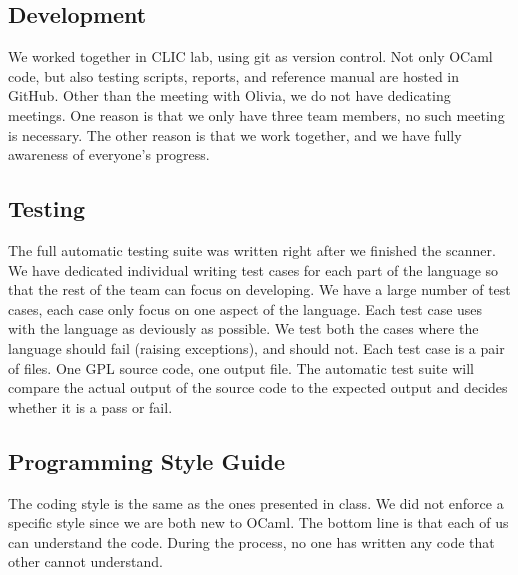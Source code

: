 \documentclass[a4paper,12pt]{article}
\begin{document}
\subsection{Development}
We worked together in CLIC lab, using git as version control. Not only OCaml code, but also testing scripts, reports, and reference manual are hosted in GitHub. Other than the meeting with Olivia, we do not have dedicating meetings. One reason is that we only have three team members, no such meeting is necessary. The other reason is that we work together, and we have fully awareness of everyone's progress. 

\subsection{Testing}
The full automatic testing suite was written right after we finished the scanner. We have dedicated individual writing test cases for each part of the language so that the rest of the team can focus on developing. We have a large number of test cases, each case only focus on one aspect of the language. Each test case uses with the language as deviously as possible. We test both the cases where the language should fail (raising exceptions), and should not. Each test case is a pair of files. One GPL source code, one output file. The automatic test suite will compare the actual output of the source code to the expected output and decides whether it is a pass or fail.

\subsection{Programming Style Guide}
The coding style is the same as the ones presented in class. We did not enforce a specific style since we are both new to OCaml. The bottom line is that each of us can understand the code. During the process, no one has written any code that other cannot understand.
\end{document}
